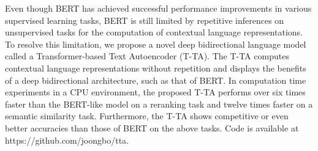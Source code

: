 Even though BERT has achieved successful performance improvements in various supervised learning tasks, BERT is still limited by repetitive inferences on unsupervised tasks for the computation of contextual language representations. To resolve this limitation, we propose a novel deep bidirectional language model called a Transformer-based Text Autoencoder (T-TA). The T-TA computes contextual language representations without repetition and displays the benefits of a deep bidirectional architecture, such as that of BERT. In computation time experiments in a CPU environment, the proposed T-TA performs over six times faster than the BERT-like model on a reranking task and twelve times faster on a semantic similarity task. Furthermore, the T-TA shows competitive or even better accuracies than those of BERT on the above tasks. Code is available at https://github.com/joongbo/tta.
